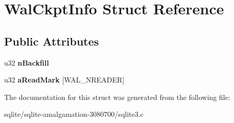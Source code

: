 \hypertarget{struct_wal_ckpt_info}{\section{Wal\+Ckpt\+Info Struct Reference}
\label{struct_wal_ckpt_info}
}
\subsection*{Public Attributes}
\begin{DoxyCompactItemize}
\item 
\hypertarget{struct_wal_ckpt_info_a5185e508f7da44c391b692e957a84ff6}{u32 {\bfseries n\+Backfill}}\label{struct_wal_ckpt_info_a5185e508f7da44c391b692e957a84ff6}

\item 
\hypertarget{struct_wal_ckpt_info_a3bc01a8244045941d5f59f01123a7735}{u32 {\bfseries a\+Read\+Mark} \mbox{[}W\+A\+L\+\_\+\+N\+R\+E\+A\+D\+E\+R\mbox{]}}\label{struct_wal_ckpt_info_a3bc01a8244045941d5f59f01123a7735}

\end{DoxyCompactItemize}


The documentation for this struct was generated from the following file\+:\begin{DoxyCompactItemize}
\item 
sqlite/sqlite-\/amalgamation-\/3080700/sqlite3.\+c\end{DoxyCompactItemize}
